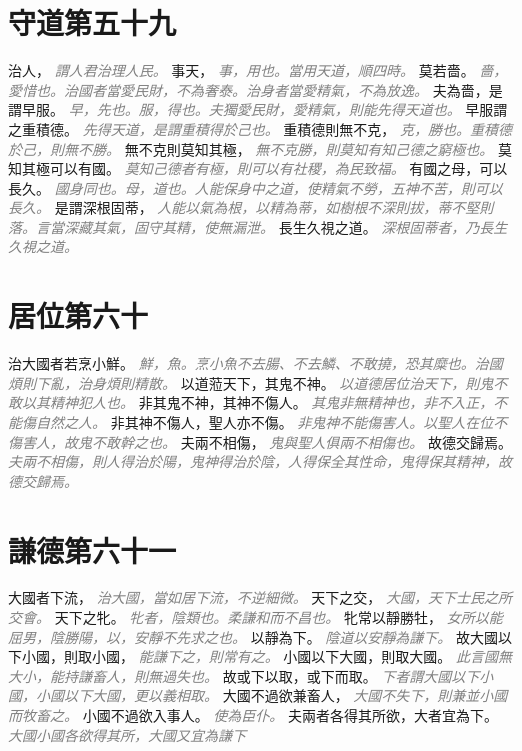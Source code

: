 \documentclass[a4paper,zihao=-4,oneside,landscape,UTF8]{ctexart}
\newcommand{\zhushi}[1]{\scriptsize{\textit{\textcolor{gray}{#1}}}\normalsize}
\begin{document}
\section{守道第五十九}

治人，
\zhushi{謂人君治理人民。}
事天，
\zhushi{事，用也。當用天道，順四時。}
莫若嗇。
\zhushi{嗇，愛惜也。治國者當愛民財，不為奢泰。治身者當愛精氣，不為放逸。}
夫為嗇，是謂早服。
\zhushi{早，先也。服，得也。夫獨愛民財，愛精氣，則能先得天道也。}
早服謂之重積德。
\zhushi{先得天道，是謂重積得於己也。}
重積德則無不克，
\zhushi{克，勝也。重積德於己，則無不勝。}
無不克則莫知其極，
\zhushi{無不克勝，則莫知有知己德之窮極也。}
莫知其極可以有國。
\zhushi{莫知己德者有極，則可以有社稷，為民致福。}
有國之母，可以長久。
\zhushi{國身同也。母，道也。人能保身中之道，使精氣不勞，五神不苦，則可以長久。}
是謂深根固蒂，
\zhushi{人能以氣為根，以精為蒂，如樹根不深則拔，蒂不堅則落。言當深藏其氣，固守其精，使無漏泄。}
長生久視之道。
\zhushi{深根固蒂者，乃長生久視之道。}


\section{居位第六十}

治大國者若烹小鮮。
\zhushi{鮮，魚。烹小魚不去腸、不去鱗、不敢撓，恐其糜也。治國煩則下亂，治身煩則精散。}
以道蒞天下，其鬼不神。
\zhushi{以道德居位治天下，則鬼不敢以其精神犯人也。}
非其鬼不神，其神不傷人。
\zhushi{其鬼非無精神也，非不入正，不能傷自然之人。}
非其神不傷人，聖人亦不傷。
\zhushi{非鬼神不能傷害人。以聖人在位不傷害人，故鬼不敢幹之也。}
夫兩不相傷，
\zhushi{鬼與聖人俱兩不相傷也。}
故德交歸焉。
\zhushi{夫兩不相傷，則人得治於陽，鬼神得治於陰，人得保全其性命，鬼得保其精神，故德交歸焉。}


\section{謙德第六十一}

大國者下流，
\zhushi{治大國，當如居下流，不逆細微。}
天下之交，
\zhushi{大國，天下士民之所交會。}
天下之牝。
\zhushi{牝者，陰類也。柔謙和而不昌也。}
牝常以靜勝牡，
\zhushi{女所以能屈男，陰勝陽，以，安靜不先求之也。}
以靜為下。
\zhushi{陰道以安靜為謙下。}
故大國以下小國，則取小國，
\zhushi{能謙下之，則常有之。}
小國以下大國，則取大國。
\zhushi{此言國無大小，能持謙畜人，則無過失也。}
故或下以取，或下而取。
\zhushi{下者謂大國以下小國，小國以下大國，更以義相取。}
大國不過欲兼畜人，
\zhushi{大國不失下，則兼並小國而牧畜之。}
小國不過欲入事人。
\zhushi{使為臣仆。}
夫兩者各得其所欲，大者宜為下。
\zhushi{大國小國各欲得其所，大國又宜為謙下}
\end{document}
